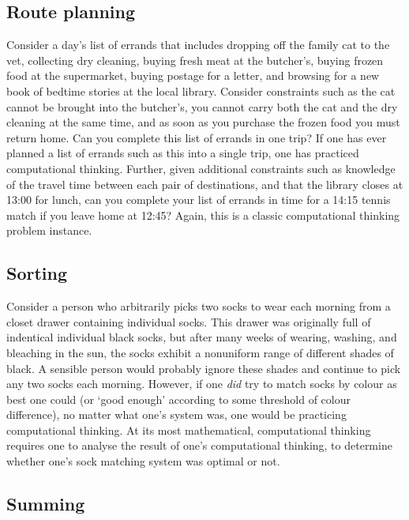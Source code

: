 \documentclass[a4paper]{article}
\begin{document}
\subsection{Route planning}

Consider a day's list of errands that includes dropping off the family cat to the vet, collecting dry cleaning, buying fresh meat at the butcher's, buying frozen food at the supermarket, buying postage for a letter, and browsing for a new book of bedtime stories at the local library. Consider constraints such as the cat cannot be brought into the butcher's, you cannot carry both the cat and the dry cleaning at the same time, and as soon as you purchase the frozen food you must return home. Can you complete this list of errands in one trip? If one has ever planned a list of errands such as this into a single trip, one has practiced computational thinking. Further, given additional constraints such as knowledge of the travel time between each pair of destinations, and that the library closes at 13:00 for lunch, can you complete your list of errands in time for a 14:15 tennis match if you leave home at 12:45? Again, this is a classic computational thinking problem instance.


\subsection{Sorting}

Consider a person who arbitrarily picks two socks to wear each morning from a closet drawer containing individual socks. This drawer was originally full of indentical individual black socks, but after many weeks of wearing, washing, and bleaching in the sun, the socks exhibit a nonuniform range of different shades of black. A sensible person would probably ignore these shades and continue to pick any two socks each morning. However, if one \emph{did} try to match socks by colour as best one could (or `good enough' according to some threshold of colour difference), no matter what one's system was, one would be practicing computational thinking. At its most mathematical, computational thinking requires one to analyse the result of one's computational thinking, to determine whether one's sock matching system was optimal or not.

\subsection{Summing}
\end{document}
